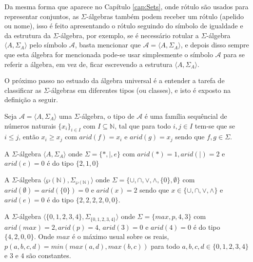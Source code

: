 \begin{nota}
  Da mesma forma que aparece no Capítulo \ref{cap:Sets}, onde rótulo são usados para representar conjuntos, as $\Sigma$-álgebras também podem receber um rótulo (apelido ou nome), isso é feito apresentando o rótulo seguindo do símbolo de igualdade e da estrutura da $\Sigma$-álgebra, por exemplo, se é necessário rotular a $\Sigma$-álgebra $\langle A, \Sigma_A \rangle$ pelo símbolo $\mathcal{A}$, basta mencionar que $\mathcal{A} = \langle A, \Sigma_A \rangle$, e depois disso sempre que esta álgebra for mencionada pode-se usar simplesmente o símbolo $\mathcal{A}$ para se referir a álgebra, em vez de, ficar escrevendo a estrutura $\langle A, \Sigma_A \rangle$.
\end{nota}

O próximo passo no estuado da álgebra universal é a entender a tarefa de classificar as $\Sigma$-álgebras em diferentes tipos (ou classes), e isto é exposto na definição a seguir.

\begin{definicao}
  Seja $\mathcal{A} = \langle A, \Sigma_A \rangle$ uma $\Sigma$-álgebra, o tipo de $\mathcal{A}$ é uma família sequêncial de números naturais $\{x_i\}_{i \in I}$ com $I \subseteq \mathbb{N}$, tal que para todo $i, j \in I$ tem-se que se $i \leq j$, então $x_i \geq x_j$ com $arid(f) = x_i$ e $arid(g) = x_j$ sendo que $f, g 
  \in \Sigma$.
\end{definicao}

\begin{exemplo}\label{exe:TipoSigmaAlgebra1}
  A $\Sigma$-álgebra $\langle A, \Sigma_A \rangle$ onde $\Sigma = \{ *, \mid, e \}$ com $arid(*) = 1, arid(\mid) = 2$ e $arid(e) = 0$ é do tipo $\{2, 1, 0\}$
\end{exemplo}

\begin{exemplo}\label{exe:TipoSigmaAlgebra2}
  A $\Sigma$-álgebra $\langle \wp(\mathbb{N}), \Sigma_{\wp(\mathbb{N})} \rangle$ onde $\Sigma = \{ \cup, \cap, \vee, \wedge, \{0\}, \emptyset \}$ com $arid(\emptyset) = arid(\{0\}) = 0$ e $arid(x) = 2$ sendo que $x \in \{\cup, \cap, \vee, \wedge\}$ e $arid(e) = 0$ é do tipo $\{2, 2, 2, 2, 0, 0\}$.
\end{exemplo}

\begin{exemplo}\label{exe:TipoSigmaAlgebra3}
  A $\Sigma$-álgebra $\langle \{0, 1, 2, 3, 4\}, \Sigma_{\{0, 1, 2, 3, 4\}} \rangle$ onde $\Sigma = \{ max, p, 4, 3 \}$ com $arid(max) = 2, arid(p) = 4$, $arid(3) = 0$ e $arid(4) = 0$ é do tipo $\{4, 2, 0, 0\}$. Onde $max$ é o máximo usual sobre os reais, $p(a, b, c, d) = min(max(a, d), max(b, c))$ para todo $a, b, c, d \in \{0, 1, 2, 3, 4\}$ e $3$ e $4$ são constantes.
\end{exemplo}

